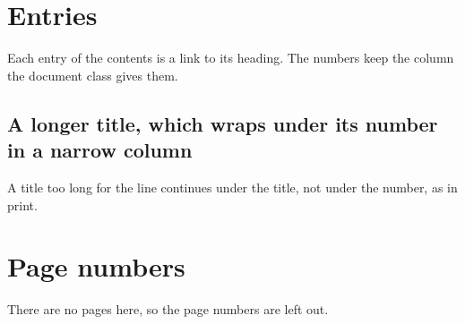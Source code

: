 \tableofcontents

\section{Entries}
Each entry of the contents is a link to its heading. The numbers keep the
column the document class gives them.

\subsection{A longer title, which wraps under its number in a narrow column}
A title too long for the line continues under the title, not under the
number, as in print.

\section{Page numbers}
There are no pages here, so the page numbers are left out.
